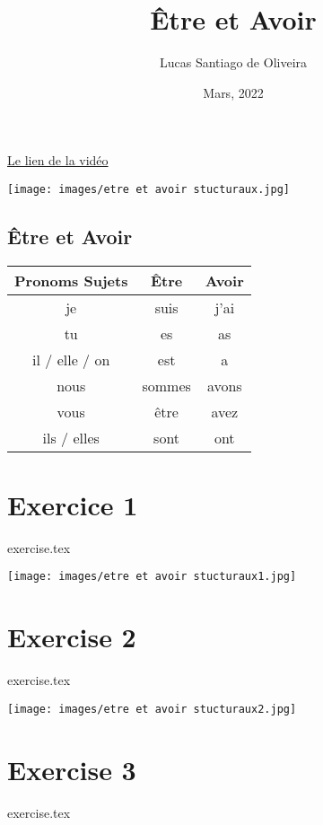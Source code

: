\documentclass{article}
\title{Être et Avoir}
\author{Lucas Santiago de Oliveira}
\date{Mars, 2022}
\begin{document}
    \maketitle

    \vspace{2cm}

    \href{https://www.youtube.com/watch?v=Z2hZIJFg9v4}{Le lien de la vidéo}
    
    \texttt{[image: images/etre et avoir stucturaux.jpg]}
    \newpage

    \begin{center}
        \section*{Être et Avoir}
        \begin{tabular}{|c|c|c|}
            \hline
            Pronoms Sujets & Être & Avoir \\
            \hline
            je & suis & j'ai \\
            \hline
            tu & es & as \\ 
            \hline
            il / elle / on & est & a \\
            \hline
            nous & sommes & avons \\
            \hline
            vous & être & avez \\
            \hline
            ils / elles & sont & ont \\
            \hline
        \end{tabular}
    \end{center}

    \section*{Exercice 1}
    {exercise.tex}

    \newpage
    \texttt{[image: images/etre et avoir stucturaux1.jpg]}

    \section*{Exercise 2}
    {exercise.tex}

    \newpage
    \texttt{[image: images/etre et avoir stucturaux2.jpg]}

    \section*{Exercise 3}
    {exercise.tex}
\end{document}
